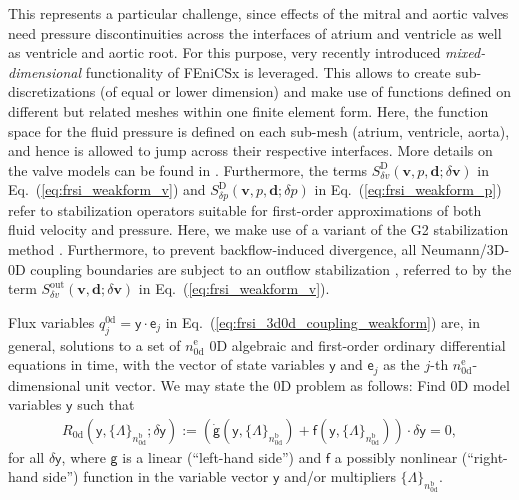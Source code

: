 This represents a particular challenge, since effects of the mitral and aortic valves need pressure discontinuities across the interfaces of atrium and ventricle as well as ventricle and aortic root. For this purpose, very recently introduced \textit{mixed-dimensional} functionality of FEniCSx is leveraged. This allows to create sub-discretizations (of equal or lower dimension) and make use of functions defined on different but related meshes within one finite element form. Here, the function space for the fluid pressure is defined on each sub-mesh (atrium, ventricle, aorta), and hence is allowed to jump across their respective interfaces. More details on the valve models can be found in \cite{hirschvogel2025-prec}.
Furthermore, the terms $S_{\delta v}^{\mathrm{D}}(\boldsymbol{v},p,\boldsymbol{d};\delta\boldsymbol{v})$ in Eq.~(\ref{eq:frsi_weakform_v}) and $S_{\delta p}^{\mathrm{D}}(\boldsymbol{v},p,\boldsymbol{d};\delta p)$ in Eq.~(\ref{eq:frsi_weakform_p}) refer to stabilization operators suitable for first-order approximations of both fluid velocity and pressure. Here, we make use of a variant of the G2 stabilization method \cite{johnson1998,hoffman2003,hessenthaler2017}. Furthermore, to prevent backflow-induced divergence, all Neumann/3D-0D coupling boundaries are subject to an outflow stabilization \cite{esmailymoghadam2011}, referred to by the term $S_{\delta v}^{\mathrm{out}}(\boldsymbol{v},\boldsymbol{d};\delta\boldsymbol{v})$ in Eq.~(\ref{eq:frsi_weakform_v}).

Flux variables $q_{j}^{\mathrm{0d}} = \boldsymbol{\mathsf{y}}\cdot\boldsymbol{\mathsf{e}}_{j}$ in Eq.~(\ref{eq:frsi_3d0d_coupling_weakform}) are, in general, solutions to a set of $n_{\mathrm{0d}}^{\mathrm{e}}$ 0D algebraic and first-order ordinary differential equations in time, with the vector of state variables $\boldsymbol{\mathsf{y}}$ and $\boldsymbol{\mathsf{e}}_{j}$ as the $j$-th $n_{\mathrm{0d}}^{\mathrm{e}}$-dimensional unit vector. We may state the 0D problem as follows: Find 0D model variables $\boldsymbol{\mathsf{y}}$ such that
\begin{equation}
\begin{aligned}
    R_{\mathrm{0d}} \left(\boldsymbol{\mathsf{y}},\{\mathit{\Lambda}\}_{n_{\mathrm{0d}}^{\mathrm{b}}}; \delta\boldsymbol{\mathsf{y}}\right) :=
    \left(\dot{\boldsymbol{\mathsf{g}}}(\boldsymbol{\mathsf{y}},\{\mathit{\Lambda}\}_{n_{\mathrm{0d}}^{\mathrm{b}}}) + 
    \boldsymbol{\mathsf{f}}(\boldsymbol{\mathsf{y}},\{\mathit{\Lambda}\}_{n_{\mathrm{0d}}^{\mathrm{b}}})\right) \cdot \delta\boldsymbol{\mathsf{y}} = 0,
    \label{eq:0d_weakform}
\end{aligned}
\end{equation}
for all $\delta\boldsymbol{\mathsf{y}}$, where $\boldsymbol{\mathsf{g}}$ is a linear (``left-hand side'') and $\boldsymbol{\mathsf{f}}$ a possibly nonlinear (``right-hand side'') function in the variable vector $\boldsymbol{\mathsf{y}}$ and/or multipliers $\{\mathit{\Lambda}\}_{n_{\mathrm{0d}}^{\mathrm{b}}}$.\\

